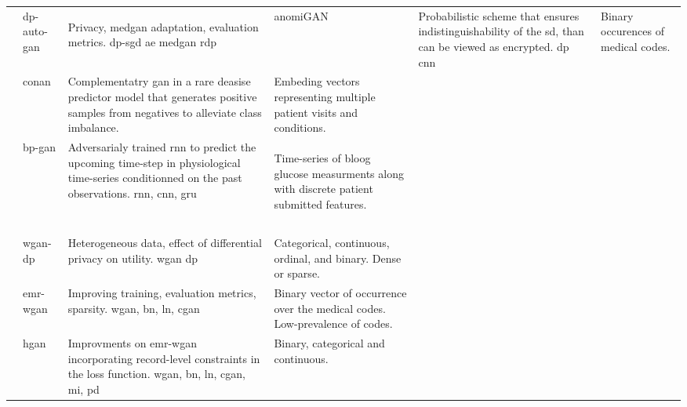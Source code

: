 \begin{sidewaystable}[htbp]
\begin{tabularx}{\textwidth}{@{}p{4cm}XXX@{}}
            \cite{tanti2019}
            & \gls{dp-auto-gan}
            & Privacy, \gls{medgan} adaptation, evaluation metrics. \gls{dp-sgd} \gls{ae} \gls{medgan} \gls{rdp}
            
            \cite{BaeAnomiGAN2020}
            & \gls{anomiGAN}
            & Probabilistic scheme that ensures indistinguishability of the \gls{sd}, than can be viewed as encrypted. \gls{dp} \gls{cnn}
            & Binary occurences of medical codes.\\
            
            \cite{cui2019conan}
            & \gls{conan}
            & Complementatry \gls{gan} in a rare deasise predictor model that generates positive samples from negatives to alleviate class imbalance.
            & Embeding vectors representing multiple patient visits and conditions.\\
            
            
            \cite{zhu_2020}
            & \gls{bp-gan}
            & Adversarialy trained \gls{rnn} to predict the upcoming time-step in physiological time-series conditionned on the past observations. \gls{rnn}, \gls{cnn}, \gls{gru}
            & Time-series of bloog glucose measurments along with discrete patient submitted features.
            
            \cite{chen2019ganleaks}
            & 
            & 
            &\\
            
            \cite{Zhang2020}
            & 
            & 
            &\\
            
            \cite{Yale_2020}
            & 
            & 
            &\\
            
            \cite{chincheong2020generation}
            &  \gls{wgan-dp}
            & Heterogeneous data, effect of differential privacy on utility. \gls{wgan} \gls{dp}
            & Categorical, continuous,  ordinal, and binary. Dense or sparse.\\
            
            \cite{Zhang2020}
            &\gls{emr-wgan}
            & Improving training, evaluation metrics, sparsity. \gls{wgan}, \gls{bn}, \gls{ln}, \gls{cgan}
            & Binary vector of occurrence over the medical codes. Low-prevalence of codes. \\
            
            \cite{yan2020generating}
            & \gls{hgan}
            & Improvments on \gls{emr-wgan} incorporating record-level constraints in the loss function.  \gls{wgan}, \gls{bn}, \gls{ln}, \gls{cgan}, \gls{mi}, \gls{pd}
            & Binary, categorical and continuous.\\
            

\end{tabularx}
\end{sidewaystable}

